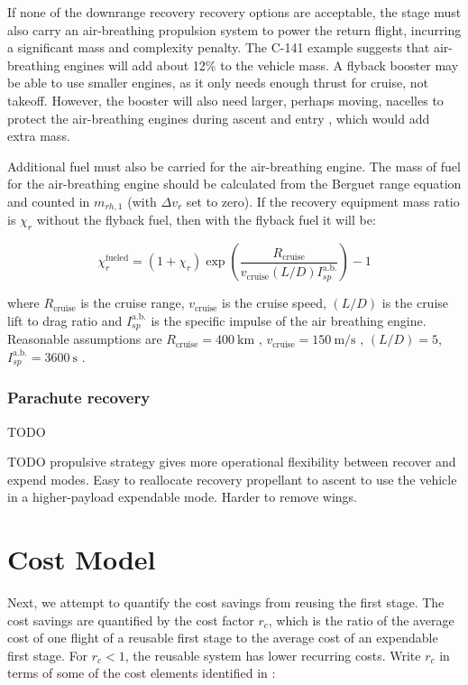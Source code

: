 \documentclass[conf]{new-aiaa}
\begin{document}
If none of the downrange recovery recovery options are acceptable, the stage must also carry an air-breathing propulsion system to power the return flight, incurring a significant mass and complexity penalty.
The C-141 example suggests that air-breathing engines will add about 12\% to the vehicle mass. A flyback booster may be able to use smaller engines, as it only needs enough thrust for cruise, not takeoff. However, the booster will also need larger, perhaps moving, nacelles to protect the air-breathing engines during ascent and entry \cite{Healy1998}, which would add extra mass.


Additional fuel must also be carried for the air-breathing engine. The mass of fuel for the air-breathing engine should be calculated from the Berguet range equation and counted in $m_{rh,1}$ (with $\Delta v_r$ set to zero). If the recovery equipment mass ratio is $\chi_r$ without the flyback fuel, then with the flyback fuel it will be:

\begin{equation}
\chi_r^{\mathrm{fueled}} = (1 + \chi_r) \exp\left( \frac{R_{\mathrm{cruise}}}{v_{\mathrm{cruise}} (L/D) I_{sp}^{\mathrm{a.b.}}} \right) - 1
\end{equation}

where $R_{\mathrm{cruise}}$ is the cruise range, $v_{\mathrm{cruise}}$ is the cruise speed, $(L/D)$ is the cruise lift to drag ratio and $I_{sp}^{\mathrm{a.b.}}$ is the specific impulse of the air breathing engine. Reasonable assumptions are  $R_{\mathrm{cruise}} = \SI{400}{\kilo\meter}$ \cite{Healy1998}, $v_{\mathrm{cruise}} = \SI{150}{\meter\per\second}$ \cite{Healy1998}, $(L/D) = 5$, $I_{sp}^{\mathrm{a.b.}} = \SI{3600}{\second}$ \cite{Hellman2005}.

\subsubsection{Parachute recovery}
TODO



TODO propulsive strategy gives more operational flexibility between recover and expend modes. Easy to reallocate recovery propellant to ascent to use the vehicle in a higher-payload expendable mode.  Harder to remove wings.



\section{Cost Model}
Next, we attempt to quantify the cost savings from reusing the first stage. The cost savings are quantified by the cost factor $r_c$, which is the ratio of the average cost of one flight of a reusable first stage to the average cost of an expendable first stage. For $r_c < 1$, the reusable system has lower recurring costs. Write $r_c$ in terms of some of the cost elements identified in \cite{Sforza2015}:
\end{document}

